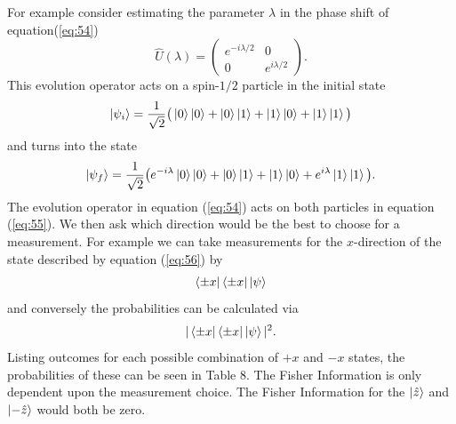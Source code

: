 \documentclass[twocolumn]{article}
\begin{document}
For example consider estimating the parameter $\lambda$ in the phase shift of equation(\ref{eq:54})
\begin{equation} \label{eq:54}
\hat{U}(\lambda)=
\begin{pmatrix}
e^{-i\lambda/2} & 0 \\
0 & e^{i\lambda/2}
\end{pmatrix}.
\end{equation}
This evolution operator acts on a spin-$1/2$ particle in the initial state
\begin{equation} \label{eq:55}
\ket{\psi_i}=\frac{1}{\sqrt{2}}\big(\ket{0}\ket{0}+\ket{0}\ket{1}+\ket{1}\ket{0}+\ket{1}\ket{1}\big)
\end{equation}
and turns into the state
\begin{equation} \label{eq:56}
\ket{\psi_f}=\frac{1}{\sqrt{2}}\big(e^{-i\lambda}\ket{0}\ket{0}+\ket{0}\ket{1}+\ket{1}\ket{0}+e^{i\lambda}\ket{1}\ket{1}\big).
\end{equation}
The evolution operator in equation (\ref{eq:54}) acts on both particles in equation (\ref{eq:55}). 
We then ask which direction would be the best to choose for a measurement. For example we can take measurements for the $x$-direction of the state described by equation (\ref{eq:56}) by
\begin{equation} \label{eq:57}
\bra{\pm x}\bra{\pm x}\ket{\psi}
\end{equation}
and conversely the probabilities can be calculated via
\begin{equation} \label{eq:58}
|\bra{\pm x}\bra{\pm x}\ket{\psi}|^2.
\end{equation}
Listing outcomes for each possible combination of $+x$ and $-x$ states, the probabilities of these can be seen in Table 8. The Fisher Information is only dependent upon the measurement choice. The Fisher Information for the $\ket{\hat{z}}$ and $\ket{-\hat{z}}$ would both be zero.
\newpage
\end{document}
